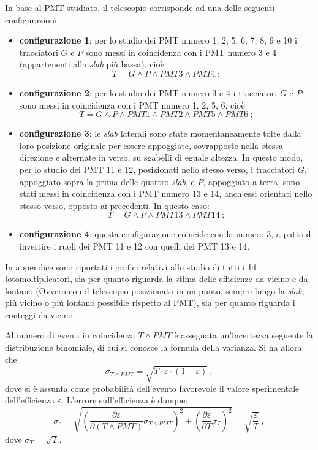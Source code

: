 \documentclass[10pt, oneside, a4paper]{article}   	%
\renewcommand{\epsilon}{\varepsilon}			%
\begin{document}
In base al PMT studiato, il telescopio corrisponde ad una delle seguenti configurazioni:
\begin{itemize}
	\item[] \textbf{configurazione 1}: per lo studio dei PMT numero 1, 2, 5, 6, 7, 8, 9 e 10 i tracciatori $G$ e $P$ sono messi in coincidenza con i PMT numero 3 e 4 (appartenenti alla \emph{slab} più bassa), cioè \[T = G\wedge P \wedge PMT3 \wedge PMT4 \ ;\]
%
	\item[] \textbf{configurazione 2}: per lo studio dei PMT numero 3 e 4 i tracciatori $G$ e $P$ sono messi in coincidenza con i PMT numero 1, 2, 5, 6, cioè \[T = G\wedge P \wedge PMT1 \wedge PMT2 \wedge PMT5 \wedge PMT6 \ ; \]
%
	\item[] \textbf{configurazione 3}: le \emph{slab} laterali sono state momentaneamente tolte dalla loro posizione originale per essere appoggiate, sovrapposte nella stessa direzione e alternate in verso, su sgabelli di eguale altezza. In questo modo, per lo studio dei PMT 11 e 12, posizionati nello stesso verso, i tracciatori $G$, appoggiato sopra la prima delle quattro \emph{slab}, e $P$, appoggiato a terra, sono stati messi in coincidenza con i PMT numero 13 e 14, anch'essi orientati nello stesso verso, opposto ai precedenti. In questo caso: \[T = G\wedge P \wedge PMT13 \wedge PMT14 \ ;\]
%
	\item[] \textbf{configurazione 4}: questa configurazione coincide con la numero 3, a patto di invertire i ruoli dei PMT 11 e 12 con quelli dei PMT 13 e 14. 
\end{itemize}
In appendice sono riportati i grafici relativi allo studio di tutti i 14 fotomoltiplicatori, sia per quanto riguarda la stima delle efficienze da vicino e da lontano (Ovvero con il telescopio posizionato in un punto, sempre lungo la \textit{slab}, più vicino o più lontano possibile rispetto al PMT), sia per quanto riguarda i conteggi da vicino.

Al numero di eventi in coincidenza $T\wedge PMT$ è assegnata un'incertezza seguente la distribuzione binomiale, di cui si conosce la formula della varianza.  
Si ha allora che 
\[\sigma_{T\wedge PMT} = \sqrt{T \cdot \varepsilon \cdot  (1-\varepsilon)} \ , \]
dove si è assunta come probabilità dell'evento favorevole il valore sperimentale dell'efficienza $\varepsilon$.
L'errore sull'efficienza è dunque:
$$\sigma_\epsilon=\sqrt{ \left(\frac{\partial\epsilon}{\partial (T\wedge PMT)}\sigma_{T\wedge PMT}\right)^2 + \left(\frac{\partial \epsilon}{\partial T}\sigma_T\right)^2 }=\sqrt{\frac{\epsilon}{T}} \ , $$
dove $\sigma_T = \sqrt{T}$.
\end{document}
